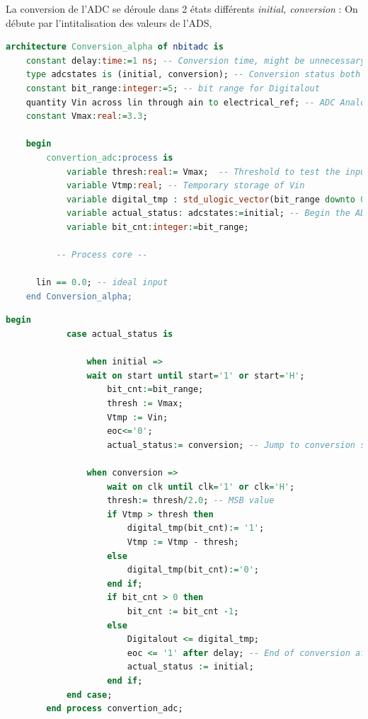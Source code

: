 \documentclass[a4paper]{article}
\begin{document}
La conversion de l'ADC se d\'eroule dans 2 \'etats diff\'erents \textit{initial, conversion} :
 On d\'ebute par l'intitalisation des valeurs de l'ADS,
\begin{lstlisting}[language=VHDL, belowskip=-0.5 \baselineskip]
architecture Conversion_alpha of nbitadc is
	constant delay:time:=1 ns; -- Conversion time, might be unnecessary
	type adcstates is (initial, conversion); -- Conversion status both initial and on time
	constant bit_range:integer:=5; -- bit range for Digitalout
	quantity Vin across lin through ain to electrical_ref; -- ADC Analog input
	constant Vmax:real:=3.3;

	begin
		convertion_adc:process is
			variable thresh:real:= Vmax;  -- Threshold to test the input voltage against
			variable Vtmp:real; -- Temporary storage of Vin
			variable digital_tmp : std_ulogic_vector(bit_range downto 0); -- Temporary digital output data
			variable actual_status: adcstates:=initial; -- Begin the ADC states with the initial state
			variable bit_cnt:integer:=bit_range;

          -- Process core --

      lin == 0.0; -- ideal input
    end Conversion_alpha;
\end{lstlisting}

\begin{lstlisting}[caption={Coeur du process pour le convertisseur},captionpos=b,language=VHDL, belowskip=-0.5 \baselineskip]
			begin
			case actual_status is

				when initial =>
				wait on start until start='1' or start='H';
					bit_cnt:=bit_range;
					thresh := Vmax;
					Vtmp := Vin;
					eoc<='0';
					actual_status:= conversion; -- Jump to conversion state

				when conversion =>
					wait on clk until clk='1' or clk='H';
					thresh:= thresh/2.0; -- MSB value
					if Vtmp > thresh then
						digital_tmp(bit_cnt):= '1';
						Vtmp := Vtmp - thresh;
					else
						digital_tmp(bit_cnt):='0';
					end if;
					if bit_cnt > 0 then
						bit_cnt := bit_cnt -1;
					else
						Digitalout <= digital_tmp;
						eoc <= '1' after delay; -- End of conversion after a delay
						actual_status := initial;
					end if;
			end case;
		end process convertion_adc;

\end{lstlisting}

\clearpage
\end{document}

